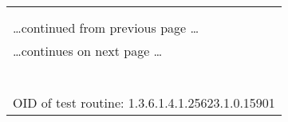 \documentclass{article}
\begin{document}
\begin{longtable}{|p{}|}
\hline
\rowcolor{openvas_log}{\color{white}{Log (CVSS: 0.0) }}\\
\rowcolor{openvas_log}{\color{white}{NVT: SSL Certificate Expiry}}\\
\hline
\endfirsthead
\hfill\ldots continued from previous page \ldots \\
\hline
\endhead
\hline
\ldots continues on next page \ldots \\
\endfoot
\hline
\endlastfoot
\\
\rowcolor{white}{\verb=The SSL certificate of the remote service is valid between=}\\
\rowcolor{white}{\verb=2014-12-04 15:16:06 GMT and 2015-12-04 15:16:06 GMT.=}\\
\rowcolor{white}{\verb==}\\
\rowcolor{white}{\verb==}\\
\\
OID of test routine: 1.3.6.1.4.1.25623.1.0.15901\\
\end{longtable}
\end{document}
